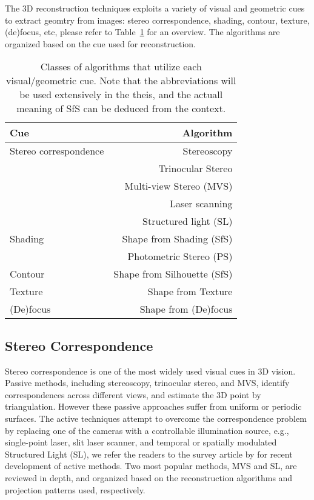The 3D reconstruction techniques exploits a variety of visual and geometric cues to extract geomtry from images: stereo correspondence, shading, contour, texture, (de)focus, etc, please refer to Table~\ref{tab:cue_algo} for an overview. The algorithms are organized based on the cue used for reconstruction.
\begin{table}[h]
  \centering
  \begin{tabular}{l|r}
  \toprule
  \textbf{Cue} & \textbf{Algorithm}\\
  \midrule
  Stereo correspondence & Stereoscopy\\
  & Trinocular Stereo\\
  & Multi-view Stereo (MVS)\\
  & Laser scanning\\
  & Structured light (SL)\\
  \hline
  Shading & Shape from Shading (SfS)\\
  & Photometric Stereo (PS)\\
  \hline
  Contour & Shape from Silhouette (SfS)\\
  \hline
  Texture & Shape from Texture\\
  \hline
  (De)focus & Shape from (De)focus\\
  \bottomrule
  \end{tabular}
  \caption{Classes of algorithms that utilize each visual/geometric cue. Note that the abbreviations will be used extensively in the theis, and the actuall meaning of SfS can be deduced from the context.}
  \label{tab:cue_algo}
\end{table}

\subsection{Stereo Correspondence}
Stereo correspondence is one of the most widely used visual cues in 3D vision. Passive methods, including stereoscopy, trinocular stereo, and MVS, identify correspondences across different views, and estimate the 3D point by triangulation. However these passive approaches suffer from uniform or periodic surfaces. The active techniques attempt to overcome the correspondence problem by replacing one of the cameras with a controllable illumination source, e.g., single-point laser, slit laser scanner, and temporal or spatially modulated Structured Light (SL), we refer the readers to the survey article by \citeauthor{blais2004review} for recent development of active methods. Two most popular methods, MVS and SL, are reviewed in depth, and organized based on the reconstruction algorithms and projection patterns used, respectively.

